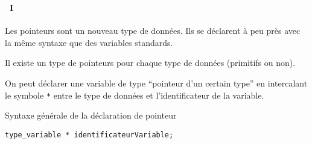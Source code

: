 \begin{frame}[containsverbatim]
  \frametitle{\secname}
  \framesubtitle{\subsecname~I}
  
  Les pointeurs sont un nouveau type de données. Ils se déclarent à peu près avec la même syntaxe que des variables standards.
  \vspace{0.5cm}
  \par
  Il existe un type de pointeurs pour chaque type de données (primitifs ou non).
  \vspace{0.5cm}
  \par
  On peut déclarer une variable de type ``pointeur d'un certain type'' en intercalant le symbole \texttt{*} entre le type de données et
  l'identificateur de la variable.
  \vspace{0.5cm}
  \begin{block}{Syntaxe générale de la déclaration de pointeur}
    \begin{verbatim}
type_variable * identificateurVariable;\end{verbatim} 
  \end{block}   
\end{frame}

